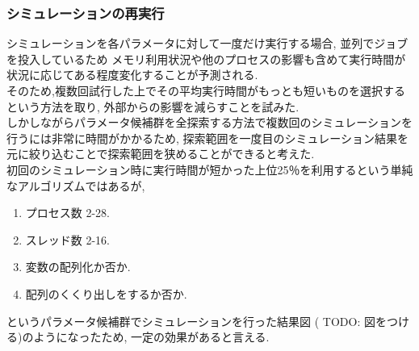 \subsubsection{シミュレーションの再実行}
シミュレーションを各パラメータに対して一度だけ実行する場合, 並列でジョブを投入しているため
メモリ利用状況や他のプロセスの影響も含めて実行時間が状況に応じてある程度変化することが予測される.\\
そのため,複数回試行した上でその平均実行時間がもっとも短いものを選択するという方法を取り,
外部からの影響を減らすことを試みた.\\
しかしながらパラメータ候補群を全探索する方法で複数回のシミュレーションを行うには非常に時間がかかるため,
探索範囲を一度目のシミュレーション結果を元に絞り込むことで探索範囲を狭めることができると考えた.\\
初回のシミュレーション時に実行時間が短かった上位25％を利用するという単純なアルゴリズムではあるが,
\begin{enumerate}
\item プロセス数 2-28.
\item スレッド数 2-16.
\item 変数の配列化か否か.
\item 配列のくくり出しをするか否か.
\end{enumerate}
というパラメータ候補群でシミュレーションを行った結果図 ( TODO: 図をつける)のようになったため,
一定の効果があると言える.\\
